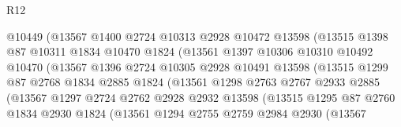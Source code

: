 \begin{lexlean}{R12}
\begin{coremodule}
                          @10449
                          (@13567
                            @1400
                            @2724
                            @10313
                            @2928
                            @10472
                            @13598
                            (@13515
                              @1398
                              @87
                              @10311
                              @1834
                              @10470
                              @1824
                              (@13561
                                @1397
                                @10306
                                @10310
                                @10492
                                @10470
                                (@13567
                                  @1396
                                  @2724
                                  @10305
                                  @2928
                                  @10491
                                  @13598
                                  (@13515
                                    @1299
                                    @87
                                    @2768
                                    @1834
                                    @2885
                                    @1824
                                    (@13561
                                      @1298
                                      @2763
                                      @2767
                                      @2933
                                      @2885
                                      (@13567
                                        @1297
                                        @2724
                                        @2762
                                        @2928
                                        @2932
                                        @13598
                                        (@13515
                                          @1295
                                          @87
                                          @2760
                                          @1834
                                          @2930
                                          @1824
                                          (@13561
                                            @1294
                                            @2755
                                            @2759
                                            @2984
                                            @2930
                                            (@13567

\end{coremodule}
\end{lexlean}
